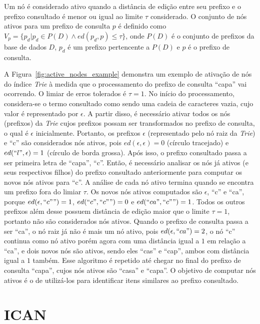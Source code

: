 Um nó é considerado ativo quando a distância de edição entre seu prefixo e o prefixo consultado é menor ou igual ao limite $\tau$ considerado. O conjunto de nós ativos para um prefixo de consulta $p$ é definido como $V_{p} = \{p_{d} | p_{d} \in P(D) \land ed(p_{d}, p) \leq \tau \}$, onde $P(D)$ é o conjunto de prefixos da base de dados $D$, $p_{d}$ é um prefixo pertencente a $P(D)$ e $p$ é o prefixo de consulta. 

A Figura~\ref{fig:active_nodes_example} demonstra um exemplo de ativação de nós do índice \textit{Trie} à medida que o processamento do prefixo de consulta ``capa'' vai ocorrendo. O limiar de erros tolerados é $\tau = 1$. No início do processamento, considera-se o termo consultado como sendo uma cadeia de caracteres vazia, cujo valor é representado por $\epsilon$. A partir disso, é necessário ativar todos os nós (prefixos) da \textit{Trie} cujos prefixos possam ser transformados no prefixo de consulta, o qual é $\epsilon$ inicialmente. Portanto, os prefixos $\epsilon$ (representado pelo nó raiz da \textit{Trie}) e ``c'' são considerados nós ativos, pois $ed(\epsilon, \epsilon) = 0$ (círculo tracejado) e $ed(``l", \epsilon) = 1$ (círculo de borda grossa). Após isso, o prefixo consultado passa a ser primeira letra de ``capa'', ``c''. Então, é necessário analisar os nós já ativos (e seus respectivos filhos) do prefixo consultado anteriormente para computar os novos nós ativos para ``c''. A análise de cada nó ativo termina quando se encontra um prefixo fora do limiar $\tau$. Os novos nós ativos computados são $\epsilon$, ``c'' e ``ca'', porque $ed(\epsilon, ``c"") = 1$, $ed(``c", ``c"") = 0$ e $ed(``ca", ``c"") = 1$. Todos os outros prefixos além desse possuem distância de edição maior que o limite $\tau = 1$, portanto não são considerados nós ativos. Quando o prefixo de consulta passa a ser ``ca'', o nó raiz já não é mais um nó ativo, pois $ed(\epsilon, ``ca") = 2$, o nó ``c'' continua como nó ativo porém agora com uma distância igual a $1$ em relação a ``ca'', e dois novos nós são ativos, sendo eles  ``cas'' e ``cap'', ambos com distância igual a $1$ também. Esse algoritmo é repetido até chegar no final do prefixo de consulta ``capa'', cujos nós ativos são ``casa'' e ``capa''. O objetivo de computar nós ativos é o de utilizá-los para identificar itens similares ao prefixo consultado.

\section{ICAN}

